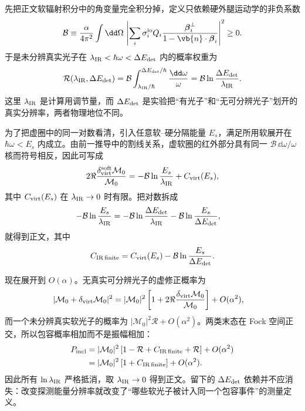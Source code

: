 \begin{derivation}[软光子实虚抵消与有限分辨率]
先把正文软辐射积分中的角变量完全积分掉，定义只依赖硬外腿运动学的非负系数
\begin{equation*}
 \mathcal B
 \equiv\frac{\alpha}{4\pi^2}
 \int\dd\Omega\,
 \left|
 \sum_i\sigma_i^{\rm io}Q_i
 \frac{\boldsymbol\beta_i^\perp}
 {1-\vb{n}\cdot\boldsymbol\beta_i}
 \right|^2\ge0.
\end{equation*}
于是未分辨真实光子在
$\lambda_{\rm IR}<\hbar\omega<\Delta E_{\rm det}$ 内的概率权重为
\begin{equation*}
 \mathcal R(\lambda_{\rm IR},\Delta E_{\rm det})
 =\mathcal B\int_{\lambda_{\rm IR}/\hbar}^{\Delta E_{\rm det}/\hbar}
 \frac{\dd\omega}{\omega}
 =\mathcal B\ln\frac{\Delta E_{\rm det}}{\lambda_{\rm IR}}.
\end{equation*}
这里 $\lambda_{\rm IR}$ 是计算用调节量，而 $\Delta E_{\rm det}$ 是实验把“有光子”和“无可分辨光子”划开的真实分辨率，两者物理地位不同。

为了把虚圈中的同一对数看清，引入任意软--硬分隔能量 $E_s$，满足所用软展开在
$\hbar\omega<E_s$ 内成立。由前一推导中的割线关系，虚软圈的红外部分具有同一 $\mathcal B\,\dd\omega/\omega$ 核而符号相反，因此可写成
\begin{equation*}
 2\Re\frac{\delta_{\rm virt}^{\rm soft}\mathcal M_0}{\mathcal M_0}
 =-\mathcal B\ln\frac{E_s}{\lambda_{\rm IR}}
 +C_{\rm virt}(E_s),
\end{equation*}
其中 $C_{\rm virt}(E_s)$ 在 $\lambda_{\rm IR}\to0$ 时有限。把对数拆成
\begin{align*}
 -\mathcal B\ln\frac{E_s}{\lambda_{\rm IR}}
 &=-\mathcal B\ln\frac{\Delta E_{\rm det}}{\lambda_{\rm IR}}
   -\mathcal B\ln\frac{E_s}{\Delta E_{\rm det}},
\end{align*}
就得到正文，其中
\[
 C_{\rm IR\,finite}
 =C_{\rm virt}(E_s)-\mathcal B\ln\frac{E_s}{\Delta E_{\rm det}}.
\]

现在展开到 $O(\alpha)$。无真实可分辨光子的虚修正概率为
\begin{align*}
 |\mathcal M_0+\delta_{\rm virt}\mathcal M_0|^2
 &=|\mathcal M_0|^2
 \left[1+2\Re\frac{\delta_{\rm virt}\mathcal M_0}{\mathcal M_0}\right]
 +O(\alpha^2),
\end{align*}
而一个未分辨真实软光子的概率为
$|\mathcal M_0|^2\mathcal R+O(\alpha^2)$。两类末态在 Fock 空间正交，所以包容概率相加而不是振幅相加：
\begin{align*}
 P_{\rm incl}
 &=|\mathcal M_0|^2
 \left[
 1-\mathcal R+C_{\rm IR\,finite}+\mathcal R
 \right]+O(\alpha^2)\\
 &=|\mathcal M_0|^2
 \left[1+C_{\rm IR\,finite}\right]+O(\alpha^2).
\end{align*}
因此所有 $\ln\lambda_{\rm IR}$ 严格抵消，取
$\lambda_{\rm IR}\to0$ 得到正文。留下的
$\Delta E_{\rm det}$ 依赖并不应消失：改变探测能量分辨率就改变了“哪些软光子被计入同一个包容事件”的测量定义。
\end{derivation}


